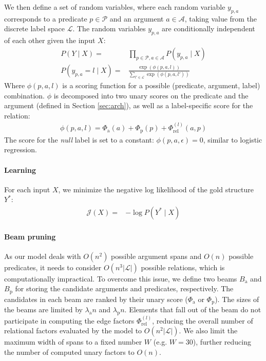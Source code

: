 \documentclass[11pt,a4paper]{article}
\begin{document}
We then define a set of random variables, where each random variable $y_{p,a}$ corresponds to a predicate $p\in\mathcal{P}$ and an argument $a\in\mathcal{A}$, 
taking value from the discrete label space $\mathcal{L}$. The random variables $y_{p,a}$ are conditionally independent of each other given the input $X$:
\begin{align}
    P(Y\mid X) =& \prod_{p\in\mathcal{P},a\in\mathcal{A}} P(y_{p,a} \mid X) \\
    P(y_{p,a}=l\mid X) =& \frac{\exp(\phi(p, a, l))}{\sum\limits_{l'\in \mathcal{L}}\exp(\phi(p, a, l'))}
\end{align}
Where $\phi(p,a,l)$ is a scoring function for a possible (predicate, argument, label) combination.
$\phi$ is decomposed into two unary scores on the predicate and the argument (defined in  Section \ref{sec:arch}), as well as a label-specific score for the relation:
\begin{align}
    \phi(p, a, l) 
    =  \Phi_{\text{a}}(a) + \Phi_{\text{p}}(p) + \Phi_{\text{rel}}^{(l)}(a, p) \label{eq:phi:tenary}
\end{align}
The score for the \textit{null} label is set to a constant:
$\phi(p, a, \epsilon) = 0$, similar to  logistic regression.

\paragraph{Learning}
For each input $X$, we minimize the negative log likelihood of the gold structure $Y^*$:
\begin{align}
    \mathcal{J}(X) =& - \log P (Y^* \mid X) \label{eq:loss}
\end{align}

\paragraph{Beam pruning}
As our model deals with $O(n^2)$ possible argument spans and $O(n)$ possible predicates, it needs to consider $O(n^3|\mathcal{L}|)$ possible relations, which is computationally impractical. To overcome this issue, we define two beams $B_{\text{a}}$ and $B_{\text{p}}$ for storing the candidate arguments and predicates, respectively. The candidates in each beam are ranked by their unary score ($\Phi_{\text{a}}$ or $\Phi_{\text{p}}$). The sizes of the beams are limited by $\lambda_{\text{a}}n$ and $\lambda_{\text{p}}n$. Elements that fall out of the beam do not participate in computing the edge factors $\Phi_{\text{rel}}^{(l)}$, reducing the overall number of relational factors evaluated by the model to  $O(n^2|\mathcal{L}|)$.
We also limit the maximum width of spans to a fixed number $W$ (e.g. $W=30$), further reducing the number of computed unary factors to $O(n)$. 
\end{document}
